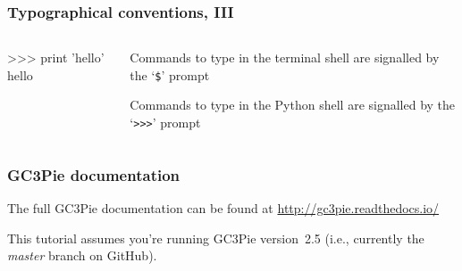 \documentclass[english,serif,mathserif,xcolor=pdftex,dvipsnames,table]{beamer}
\begin{document}
\begin{frame}[fragile]
  \frametitle{Typographical conventions, III}

    \begin{columns}[t]
    \begin{column}{0.5\textwidth}
\begin{python}
>>> print 'hello'
hello
\end{python}
    \end{column}
    \begin{column}{0.5\textwidth}
      \raggedleft
      Commands to type in the terminal shell are signalled by the `\texttt{\$}' prompt

      \+
      Commands to type in the Python shell are signalled by the `\texttt{>{}>{}>}' prompt
    \end{column}
  \end{columns}
\end{frame}

\begin{frame}
  \frametitle{GC3Pie documentation}

  The full GC3Pie documentation can be found at
  \url{http://gc3pie.readthedocs.io/}

  \+
  This tutorial assumes you're running GC3Pie version~2.5
  (i.e., currently the \emph{master} branch on GitHub).
\end{frame}
\end{document}
